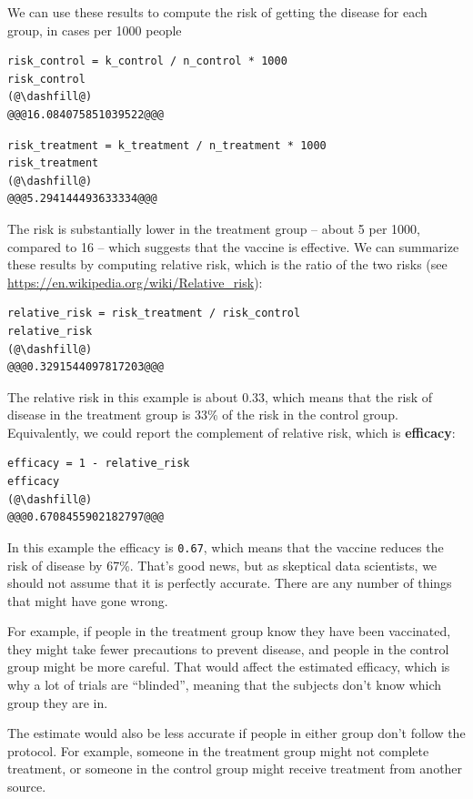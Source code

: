 We can use these results to compute the risk of getting the disease for
each group, in cases per 1000 people

\begin{lstlisting}[]
risk_control = k_control / n_control * 1000
risk_control
(@\dashfill@)
@@@16.084075851039522@@@
\end{lstlisting}

\begin{lstlisting}[]
risk_treatment = k_treatment / n_treatment * 1000
risk_treatment
(@\dashfill@)
@@@5.294144493633334@@@
\end{lstlisting}

The risk is substantially lower in the treatment group -- about 5 per
1000, compared to 16 -- which suggests that the vaccine is effective. We
can summarize these results by computing relative risk, which is the
ratio of the two risks (see
\url{https://en.wikipedia.org/wiki/Relative_risk}):

\begin{lstlisting}[]
relative_risk = risk_treatment / risk_control
relative_risk
(@\dashfill@)
@@@0.3291544097817203@@@
\end{lstlisting}

The relative risk in this example is about 0.33, which means that the
risk of disease in the treatment group is 33\% of the risk in the
control group. Equivalently, we could report the complement of relative
risk, which is \textbf{efficacy}:

\begin{lstlisting}[]
efficacy = 1 - relative_risk
efficacy
(@\dashfill@)
@@@0.6708455902182797@@@
\end{lstlisting}

In this example the efficacy is \passthrough{\lstinline!0.67!}, which
means that the vaccine reduces the risk of disease by 67\%. That's good
news, but as skeptical data scientists, we should not assume that it is
perfectly accurate. There are any number of things that might have gone
wrong.

For example, if people in the treatment group know they have been
vaccinated, they might take fewer precautions to prevent disease, and
people in the control group might be more careful. That would affect the
estimated efficacy, which is why a lot of trials are ``blinded'',
meaning that the subjects don't know which group they are in.

The estimate would also be less accurate if people in either group don't
follow the protocol. For example, someone in the treatment group might
not complete treatment, or someone in the control group might receive
treatment from another source.

